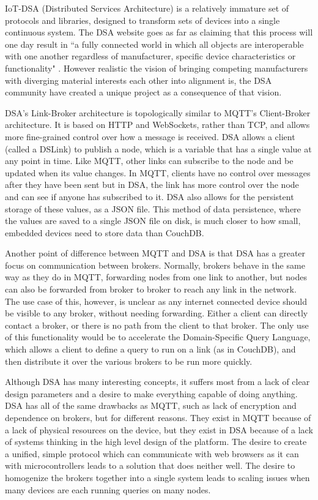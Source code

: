 \documentclass{article}
\begin{document}
IoT-DSA (Distributed Services Architecture) is a relatively immature set of protocols and libraries,  designed to transform sets of devices into a single continuous system. The DSA website goes as far as claiming that this process will one day result in ``a fully connected world in which all objects are interoperable with one another regardless of manufacturer, specific device characteristics or functionality" \cite{dsa}. However realistic the vision of bringing competing manufacturers with diverging material interests each other into alignment is, the DSA community have created a unique project as a consequence of that vision.

DSA's Link-Broker architecture is topologically similar to MQTT's Client-Broker architecture. It is based on HTTP and WebSockets, rather than TCP, and allows more fine-grained control over how a message is received. DSA allows a client (called a DSLink) to publish a node, which is a variable that has a single value at any point in time. Like MQTT, other links can subscribe to the node and be updated when its value changes. In MQTT, clients have no control over messages after they have been sent but in DSA, the link has more control over the node and can see if anyone has subscribed to it. DSA also allows for the persistent storage of these values, as a JSON file. This method of data persistence, where the values are saved to a single JSON file on disk, is much closer to how small, embedded devices need to store data than CouchDB.

Another point of difference between MQTT and DSA is that DSA has a greater focus on communication between brokers. Normally, brokers behave in the same way as they do in MQTT, forwarding nodes from one link to another, but nodes can also be forwarded from broker to broker to reach any link in the network. The use case of this, however, is unclear as any internet connected device should be visible to any broker, without needing forwarding. Either a client can directly contact a broker, or there is no path from the client to that broker. The only use of this functionality would be to accelerate the Domain-Specific Query Language, which allows a client to define a query to run on a link (as in CouchDB), and then distribute it over the various brokers to be run more quickly.

Although DSA has many interesting concepts, it suffers most from a lack of clear design parameters and a desire to make everything capable of doing anything. DSA has all of the same drawbacks as MQTT, such as lack of encryption and dependence on brokers, but for different reasons. They exist in MQTT because of a lack of physical resources on the device, but they exist in DSA because of a lack of systems thinking in the high level design of the platform. The desire to create a unified, simple protocol which can communicate with web browsers as it can with microcontrollers leads to a solution that does neither well. The desire to homogenize the brokers together into a single system leads to scaling issues when many devices are each running queries on many nodes. 
\end{document}
